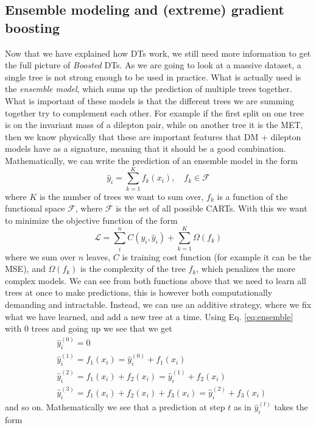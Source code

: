 \documentclass[12pt, a4paper]{book}
\begin{document}
\subsection{Ensemble modeling and (extreme) gradient boosting}
Now that we have explained how DTs work, we still need more information to get the full picture of \textit{Boosted} DTs. As we are going to look at a massive dataset, a single tree is not strong enough to be used in practice. What is actually used is the \textit{ensemble model}, which 
sums up the prediction of multiple trees together. What is important of these models is that the different trees we are summing together try to complement each other. For example if the first split on one tree is on the invariant mass of a dilepton pair, while on another tree it is the MET, 
then we know physically that these are important features that DM + dilepton models have as a signature, meaning that it should be a good combination. Mathematically, we can write the prediction of an ensemble model in the form
\begin{equation}\label{eq:ensemble}
    \hat{y}_i =\sum_{k=1}^{K}f_k(x_i),\quad f_k\in\mathcal{F}
\end{equation}
where $K$ is the number of trees we want to sum over, $f_k$ is a function of the functional space $\mathcal{F}$, where $\mathcal{F}$ is the set of all possible CARTs. With this we want to minimize the objective function of the form
$$
    \mathcal{L} = \sum_{i}^{n}C(y_i,\hat{y}_i)+\sum_{k=1}^{K}\Omega(f_k)
$$
where we sum over $n$ leaves, $C$ is training cost function (for example it can be the MSE), and $\Omega(f_k)$ is the complexity of the tree $f_k$, which penalizes the more complex models. We can see from both functions above that we need to learn all trees at once to make predictions, this is however both 
computationally demanding and intractable. Instead, we can use an additive strategy, where we fix what we have learned, and add a new tree at a time. Using Eq. \ref{eq:ensemble} with 0 trees and going up we see that we get
\begin{align*}
    &\hat{y}_i^{(0)} = 0\\
    &\hat{y}_i^{(1)} = f_1(x_i)=\hat{y}_i^{(0)}+f_1(x_i)\\
    &\hat{y}_i^{(2)} = f_1(x_i)+f_2(x_i)=\hat{y}_i^{(1)}+f_2(x_i)\\
    &\hat{y}_i^{(3)} = f_1(x_i)+f_2(x_i)+f_3(x_i)=\hat{y}_i^{(2)}+f_3(x_i)
\end{align*}
and so on. Mathematically we see that a prediction at step $t$ as in $\hat{y}_i^{(t)}$ takes the form
\end{document}
